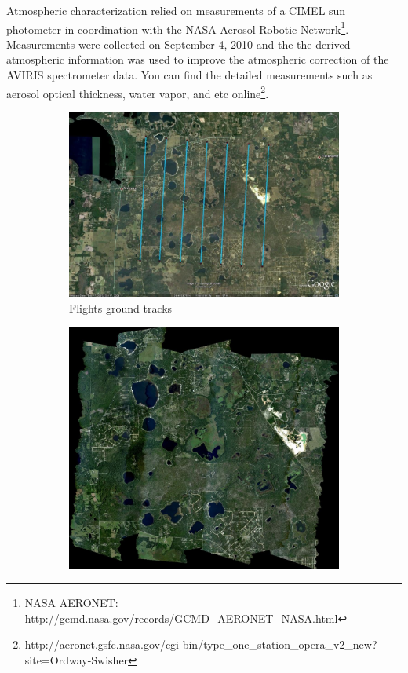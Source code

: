 \documentclass[remotesensing,article,accept,moreauthors,pdftex,12pt,a4paper]{mdpi}
\begin{document}
Atmospheric characterization relied on measurements of a CIMEL sun photometer in coordination with the NASA Aerosol Robotic Network\footnote{NASA AERONET: http://gcmd.nasa.gov/records/GCMD\_AERONET\_NASA.html}. Measurements were collected on September 4, 2010 and the the derived atmospheric information was used to improve the atmospheric correction of the AVIRIS spectrometer data. You can find the detailed measurements such as aerosol optical thickness, water vapor, and etc online\footnote{http://aeronet.gsfc.nasa.gov/cgi-bin/type\_one\_station\_opera\_v2\_new?site=Ordway-Swisher}.
 

\begin{figure}[t]
    \centering
    \begin{subfigure}[b]{0.3\textwidth}
        \centering
        \includegraphics[width=\textwidth]{./images/JPL_AVIRIS_flight_ground_tracks_OSBS_9_4_10.png}
        \caption{Flights ground tracks}
        \label{fig:JPL_AVIRIS_flight_ground_tracks_OSBS_9_4_10}
    \end{subfigure}
    \hfill
    \begin{subfigure}[b]{0.3\textwidth}
        \centering
        \includegraphics[width=\textwidth]{./images/JPL_AVIRIS_true_color_mosaic_OSBS_9_4_10.png}

\end{subfigure}
\end{figure}
\end{document}
